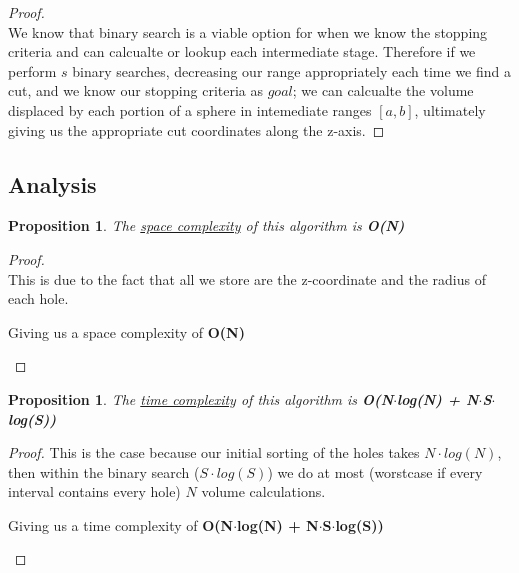 \documentclass[12pt]{article}
\newtheorem{proposition}[theorem]{Proposition}
\begin{document}
\begin{proof}
~ \\ \indent We know that binary search is a viable option for when we know the stopping criteria and
can calcualte or lookup each intermediate stage. Therefore if we perform $s$ binary searches, decreasing
our range appropriately each time we find a cut, and we know our stopping criteria as $goal$; we can
calcualte the volume displaced by each portion of a sphere in intemediate ranges $[a,b]$, ultimately
giving us the appropriate cut coordinates along the z-axis.
\end{proof}

\newpage
\subsection{Analysis}

\begin{proposition}
\label{numq}
The \underline{space complexity} of this algorithm is \textbf{O(N)}
\end{proposition}

\begin{proof}
~ \\ \indent This is due to the fact that all we store are the z-coordinate and the radius of
each hole.
\begin{center}
    Giving us a space complexity of \textbf{O(N)}
\end{center}
\end{proof}

\begin{proposition}
\label{numq}
The \underline{time complexity} of this algorithm is \textbf{O(N$\cdot$log(N) + N$\cdot$S$\cdot$log(S))}
\end{proposition}

\begin{proof}
This is the case because our initial sorting of the holes takes $N\cdot log(N)$, then within the binary
search ($S\cdot log(S)$) we do at most (worstcase if every interval contains every hole) $N$ volume
calculations.
\begin{center}
    Giving us a time complexity of \textbf{O(N$\cdot$log(N) + N$\cdot$S$\cdot$log(S))}
\end{center}
\end{proof}

\end{document}

